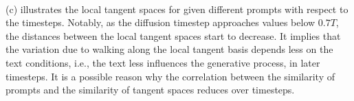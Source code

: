 
\paragraph{}
 (c) illustrates the  local tangent spaces for given different prompts with respect to the timesteps.
Notably, as the diffusion timestep approaches values below $0.7T$, the distances between the local tangent spaces start to decrease. 
It implies that the variation due to walking along the local tangent basis depends less on the text conditions, i.e., the text less influences the generative process, in later timesteps.
It is a possible reason why the correlation between the similarity of prompts and the similarity of tangent spaces reduces over timesteps.


